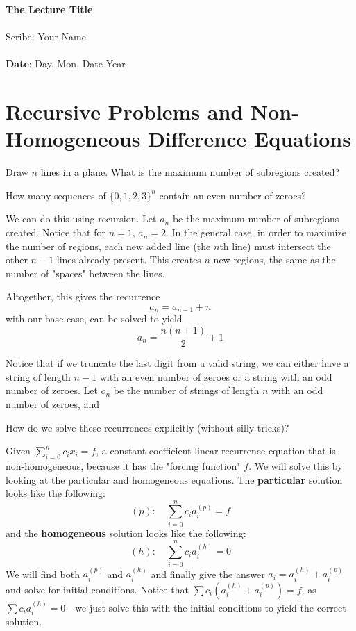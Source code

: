 \documentclass[11pt,twosided]{article}
\def\titlestring{The Lecture Title}
\def\scribestring{Your Name}
\def\datestring{Day, Mon, Date Year}
\begin{document}
\thispagestyle{plain}  %

\noindent
{\LARGE \textbf{\titlestring}}\\\\
%
{\Large Scribe: \scribestring}\\ \\
{\textbf{Date}: \datestring}


\noindent

\section{Recursive Problems and Non-Homogeneous Difference Equations}
\begin{problem}{1}
Draw $n$ lines in a plane. What is the maximum number of subregions created?
\end{problem}

\begin{problem}{2}
How many sequences of $\{ 0, 1, 2, 3 \}^n$ contain an even number of zeroes? 
\end{problem}

\begin{solution}{1}
We can do this using recursion. Let $a_n$ be the maximum number of subregions created. Notice that for $n=1$, $a_n = 2$. In the general case, in order to maximize the number of regions, each new added line (the $n$th line) must intersect the other $n-1$ lines already present. This creates $n$ new regions, the same as the number of "spaces" between the lines.

Altogether, this gives the recurrence 
\[
	a_n = a_{n-1} + n
\]
with our base case, can be solved to yield 
\[
	a_n = \frac{n(n+1)}{2} + 1
\]
\end{solution}

\begin{solution}
	Notice that if we truncate the last digit from a valid string, we can either have a string of length $n-1$ with an even number of zeroes or a string with an odd number of zeroes. Let $o_n$ be the number of strings of length $n$ with an odd number of zeroes, and 
	

\end{solution}


How do we solve these recurrences explicitly (without silly tricks)? 

Given $\sum_{i=0}^n c_i x_i = f$, a constant-coefficient linear recurrence equation that is non-homogeneous, because it has the "forcing function" $f$. We will solve this by looking at the particular and homogeneous equations. 
The \textbf{particular} solution looks like the following: 
\[
	(p): \quad \sum_{i=0}^n c_i a_i^{(p)} = f
\]
and the \textbf{homogeneous} solution looks like the following: 
\[
	(h): \quad \sum_{i=0}^n c_i a_i^{(h)} = 0
\]
We will find both $a_i^{(p)}$ and $a_i^{(h)}$ and finally give the answer $a_i = a_i^{(h)} + a_i^{(p)}$ and solve for initial conditions. Notice that 
$\sum c_i(a_i^{(h)} + a_i^{(p)}) = f$, as $\sum c_ia_i^{(h)} = 0$ - we just solve this with the initial conditions to yield the correct solution. 
\end{document}
